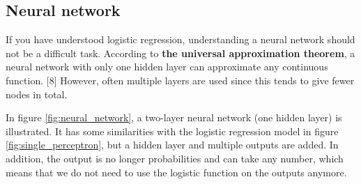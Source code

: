 \subsection{Neural network} \label{sec:neural_network}
If you have understood logistic regression, understanding a neural network should not be a difficult task. According to  \textbf{the universal approximation theorem}, a neural network with only one hidden layer can approximate any continuous function. [8] However, often multiple layers are used since this tends to give fewer nodes in total. 

In figure \eqref{fig:neural_network}, a two-layer neural network (one hidden layer) is illustrated. It has some similarities with the logistic regression model in figure \eqref{fig:single_perceptron}, but a hidden layer and multiple outputs are added. In addition, the output is no longer probabilities and can take any number, which means that we do not need to use the logistic function on the outputs anymore.

